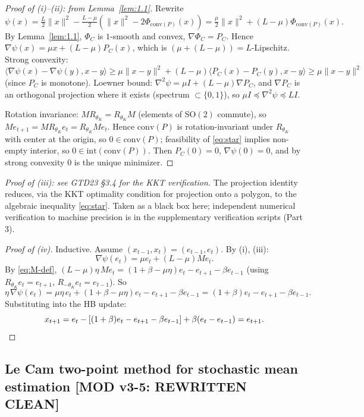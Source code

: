 \documentclass[11pt,a4paper]{article}
\theoremstyle{plain}
\theoremstyle{definition}
\theoremstyle{remark}
\newcommand{\conv}{\mathrm{conv}}
\begin{document}
\begin{proof}[Proof of (i)--(ii): from Lemma~\ref{lem:1.1}]
Rewrite
\[
\psi(x) = \tfrac{L}{2}\|x\|^2 - \tfrac{L-\mu}{2}(\|x\|^2 - 2\Phi_{\conv(P)}(x)) = \tfrac{\mu}{2}\|x\|^2 + (L-\mu) \Phi_{\conv(P)}(x).
\]
By Lemma~\ref{lem:1.1}, $\Phi_C$ is $1$-smooth and convex, $\nabla \Phi_C = P_C$. Hence $\nabla \psi(x) = \mu x + (L-\mu) P_C(x)$, which is $(\mu + (L-\mu)) = L$-Lipschitz. Strong convexity: $\langle \nabla \psi(x) - \nabla \psi(y), x - y\rangle \geq \mu \|x-y\|^2 + (L-\mu)\langle P_C(x) - P_C(y), x-y\rangle \geq \mu\|x-y\|^2$ (since $P_C$ is monotone). Loewner bound: $\nabla^2 \psi = \mu I + (L-\mu) \nabla P_C$, and $\nabla P_C$ is an orthogonal projection where it exists (spectrum $\subset \{0,1\}$), so $\mu I \preceq \nabla^2 \psi \preceq L I$.

Rotation invariance: $M R_{\theta_K} = R_{\theta_K} M$ (elements of $\mathrm{SO}(2)$ commute), so $M e_{t+1} = M R_{\theta_K} e_t = R_{\theta_K} M e_t$. Hence $\conv(P)$ is rotation-invariant under $R_{\theta_K}$ with center at the origin, so $0 \in \conv(P)$; feasibility of \eqref{eq:star} implies non-empty interior, so $0 \in \mathrm{int}(\conv(P))$. Then $P_C(0) = 0$, $\nabla \psi(0) = 0$, and by strong convexity $0$ is the unique minimizer.
\end{proof}

\emph{Proof of (iii): see GTD23 \S3.4 for the KKT verification.} The projection identity reduces, via the KKT optimality condition for projection onto a polygon, to the algebraic inequality \eqref{eq:star}. Taken as a black box here; independent numerical verification to machine precision is in the supplementary verification scripts (Part 3).

\begin{proof}[Proof of (iv)]
Inductive. Assume $(x_{t-1}, x_t) = (e_{t-1}, e_t)$. By (i), (iii):
\[
\nabla \psi(e_t) = \mu e_t + (L - \mu) M e_t.
\]
By \eqref{eq:M-def}, $(L - \mu)\eta\, M e_t = (1+\beta-\mu\eta) e_t - e_{t+1} - \beta e_{t-1}$ (using $R_{\theta_K} e_t = e_{t+1}$, $R_{-\theta_K} e_t = e_{t-1}$). So
\[
\eta\,\nabla \psi(e_t) = \mu \eta\, e_t + (1 + \beta - \mu \eta) e_t - e_{t+1} - \beta e_{t-1} = (1 + \beta) e_t - e_{t+1} - \beta e_{t-1}.
\]
Substituting into the HB update:
\[
x_{t+1} = e_t - [(1+\beta) e_t - e_{t+1} - \beta e_{t-1}] + \beta(e_t - e_{t-1}) = e_{t+1}. \qedhere
\]
\end{proof}

\subsection{Le Cam two-point method for stochastic mean estimation \textbf{[MOD v3-5: REWRITTEN CLEAN]}}
\end{document}

